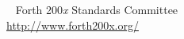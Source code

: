 \documentclass[10pt]{book}
\newcounter{savepage}
\begin{document}
		\setcounter{page}{\value{savepage}}
	\fi
\fi




\appendix















\pagestyle{empty}
~
\vfill
Forth 200\emph{x} Standards Committee \\[2ex]
\url{http://www.forth200x.org/}
\end{document}
